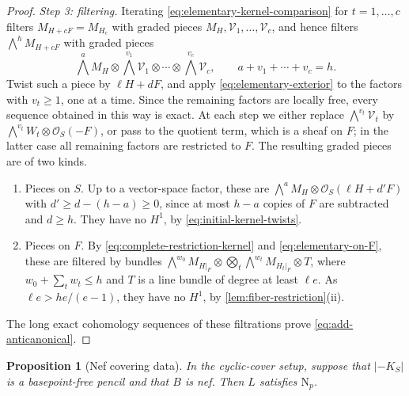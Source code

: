 \documentclass[11pt,reqno]{amsart}
\numberwithin{equation}{section}
\newtheorem{proposition}[proposition]{Proposition}
\theoremstyle{remark}
\newcommand{\sshf}[1]{\mathcal{O}_{#1}}
\newcommand{\shf}[1]{\mathscr{#1}}
\newcommand{\NP}{\mathrm N}
\begin{document}
\begin{proof}
\smallskip\noindent\emph{Step 3: filtering.} Iterating \eqref{eq:elementary-kernel-comparison} for \(t=1,\dots,c\) filters \(M_{H+cF}=M_{H_c}\) with graded pieces \(M_H,\shf{V}_1,\dots,\shf{V}_c\), and hence filters \(\bigwedge^hM_{H+cF}\) with graded pieces
\[
 \bigwedge^aM_H\otimes\bigwedge^{v_1}\shf{V}_1\otimes\cdots\otimes\bigwedge^{v_c}\shf{V}_c,
 \qquad a+v_1+\cdots+v_c=h.
\]
Twist such a piece by \(\ell H+dF\), and apply \eqref{eq:elementary-exterior} to the factors with \(v_t\geq1\), one at a time. Since the remaining factors are locally free, every sequence obtained in this way is exact. At each step we either replace \(\bigwedge^{v_t}\shf{V}_t\) by \(\bigwedge^{v_t}W_t\otimes\sshf{S}(-F)\), or pass to the quotient term, which is a sheaf on \(F\); in the latter case all remaining factors are restricted to \(F\). The resulting graded pieces are of two kinds.
\begin{enumerate}
\item[(a)] Pieces on \(S\). Up to a vector-space factor, these are \(\bigwedge^aM_H\otimes\sshf{S}(\ell H+d'F)\) with \(d'\geq d-(h-a)\geq0\), since at most \(h-a\) copies of \(F\) are subtracted and \(d\geq h\). They have no \(H^1\), by \eqref{eq:initial-kernel-twists}.
\item[(b)] Pieces on \(F\). By \eqref{eq:complete-restriction-kernel} and \eqref{eq:elementary-on-F}, these are filtered by bundles \(\bigwedge^{w_0}M_{H|_F}\otimes\bigotimes_t\bigwedge^{w_t}M_{H_t|_F}\otimes T\), where \(w_0+\sum_tw_t\leq h\) and \(T\) is a line bundle of degree at least \(\ell e\). As \(\ell e>he/(e-1)\), they have no \(H^1\), by \cref{lem:fiber-restriction}\textup{(ii)}.
\end{enumerate}
The long exact cohomology sequences of these filtrations prove \eqref{eq:add-anticanonical}.
\end{proof}

\begin{proposition}[Nef covering data]\label{prop:elliptic-nef}
In the cyclic-cover setup, suppose that \(|-K_S|\) is a basepoint-free pencil and that \(B\) is nef. Then \(L\) satisfies \(\NP_p\).
\end{proposition}
\end{document}
